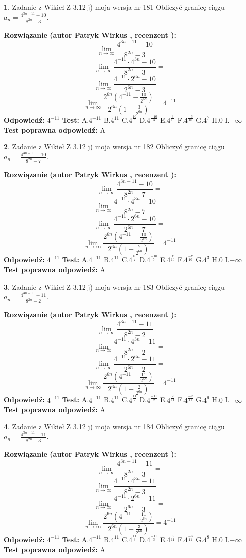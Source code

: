 \documentclass[12pt, a4paper]{article}
\theoremstyle{definition} %
\newtheorem{zad}{}
\newcommand{\zadStart}[1]{\begin{zad}#1\newline}
\newcommand{\zadStop}{\end{zad}}
\newcommand{\rozwStart}[2]{\noindent \textbf{Rozwiązanie (autor #1 , recenzent #2): }\newline}
\newcommand{\rozwStop}{\newline}
\newcommand{\odpStart}{\noindent \textbf{Odpowiedź:}\newline}
\newcommand{\odpStop}{\newline}
\newcommand{\testStart}{\noindent \textbf{Test:}\newline}
\newcommand{\testStop}{\newline}
\newcommand{\kluczStart}{\noindent \textbf{Test poprawna odpowiedź:}\newline}
\newcommand{\kluczStop}{\newline}
\begin{document}
\zadStart{Zadanie z Wikieł Z 3.12 j) moja wersja nr 181}
Obliczyć granicę ciągu $a_{n}=\frac{4^{3n-11}-10}{8^{2n}-3}$.
\zadStop
\rozwStart{Patryk Wirkus}{}
$$\lim\limits_{n\to\infty}\frac{4^{3n-11}-10}{8^{2n}-3}=$$
$$\lim\limits_{n\to\infty}\frac{4^{-11} \cdot 4^{3n}-10}{8^{2n}-3}=$$
$$\lim\limits_{n\to\infty}\frac{4^{-11} \cdot 2^{6n}-10}{2^{6n}-3}=$$
$$\lim\limits_{n\to\infty}\frac{2^{6n}(4^{-11} - \frac{10}{2^{6n}})}{2^{6n}(1-\frac{3}{2^{6n}})}= 4^{-11}$$
\rozwStop
\odpStart
$4^{-11}$
\odpStop
\testStart
A.$4^{-11}$
B.$4^{11}$
C.$4^{\frac{10}{3}}$
D.$4^{\frac{-10}{3}}$
E.$4^{\frac{3}{10}}$
F.$4^{\frac{-3}{10}}$
G.$4^{7}$
H.$0$
I.$-\infty$
\testStop
\kluczStart
A
\kluczStop



\zadStart{Zadanie z Wikieł Z 3.12 j) moja wersja nr 182}
Obliczyć granicę ciągu $a_{n}=\frac{4^{3n-11}-10}{8^{2n}-7}$.
\zadStop
\rozwStart{Patryk Wirkus}{}
$$\lim\limits_{n\to\infty}\frac{4^{3n-11}-10}{8^{2n}-7}=$$
$$\lim\limits_{n\to\infty}\frac{4^{-11} \cdot 4^{3n}-10}{8^{2n}-7}=$$
$$\lim\limits_{n\to\infty}\frac{4^{-11} \cdot 2^{6n}-10}{2^{6n}-7}=$$
$$\lim\limits_{n\to\infty}\frac{2^{6n}(4^{-11} - \frac{10}{2^{6n}})}{2^{6n}(1-\frac{7}{2^{6n}})}= 4^{-11}$$
\rozwStop
\odpStart
$4^{-11}$
\odpStop
\testStart
A.$4^{-11}$
B.$4^{11}$
C.$4^{\frac{10}{7}}$
D.$4^{\frac{-10}{7}}$
E.$4^{\frac{7}{10}}$
F.$4^{\frac{-7}{10}}$
G.$4^{3}$
H.$0$
I.$-\infty$
\testStop
\kluczStart
A
\kluczStop



\zadStart{Zadanie z Wikieł Z 3.12 j) moja wersja nr 183}
Obliczyć granicę ciągu $a_{n}=\frac{4^{3n-11}-11}{8^{2n}-2}$.
\zadStop
\rozwStart{Patryk Wirkus}{}
$$\lim\limits_{n\to\infty}\frac{4^{3n-11}-11}{8^{2n}-2}=$$
$$\lim\limits_{n\to\infty}\frac{4^{-11} \cdot 4^{3n}-11}{8^{2n}-2}=$$
$$\lim\limits_{n\to\infty}\frac{4^{-11} \cdot 2^{6n}-11}{2^{6n}-2}=$$
$$\lim\limits_{n\to\infty}\frac{2^{6n}(4^{-11} - \frac{11}{2^{6n}})}{2^{6n}(1-\frac{2}{2^{6n}})}= 4^{-11}$$
\rozwStop
\odpStart
$4^{-11}$
\odpStop
\testStart
A.$4^{-11}$
B.$4^{11}$
C.$4^{\frac{11}{2}}$
D.$4^{\frac{-11}{2}}$
E.$4^{\frac{2}{11}}$
F.$4^{\frac{-2}{11}}$
G.$4^{9}$
H.$0$
I.$-\infty$
\testStop
\kluczStart
A
\kluczStop



\zadStart{Zadanie z Wikieł Z 3.12 j) moja wersja nr 184}
Obliczyć granicę ciągu $a_{n}=\frac{4^{3n-11}-11}{8^{2n}-3}$.
\zadStop
\rozwStart{Patryk Wirkus}{}
$$\lim\limits_{n\to\infty}\frac{4^{3n-11}-11}{8^{2n}-3}=$$
$$\lim\limits_{n\to\infty}\frac{4^{-11} \cdot 4^{3n}-11}{8^{2n}-3}=$$
$$\lim\limits_{n\to\infty}\frac{4^{-11} \cdot 2^{6n}-11}{2^{6n}-3}=$$
$$\lim\limits_{n\to\infty}\frac{2^{6n}(4^{-11} - \frac{11}{2^{6n}})}{2^{6n}(1-\frac{3}{2^{6n}})}= 4^{-11}$$
\rozwStop
\odpStart
$4^{-11}$
\odpStop
\testStart
A.$4^{-11}$
B.$4^{11}$
C.$4^{\frac{11}{3}}$
D.$4^{\frac{-11}{3}}$
E.$4^{\frac{3}{11}}$
F.$4^{\frac{-3}{11}}$
G.$4^{8}$
H.$0$
I.$-\infty$
\testStop
\kluczStart
A
\kluczStop
\end{document}

